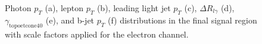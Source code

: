 \begin{figure}[]
\hfil  %
\caption{Photon $p_T$ (a), lepton $p_T$ (b), leading light jet $p_T$ (c), $\Delta R_{l\gamma}$ (d), $\gamma_\text{topoetcone40}$ (e), and b-jet $p_T$ (f) distributions in the final signal region with scale factors applied for the electron channel. }
\label{fig:SRej1}
\end{figure}


